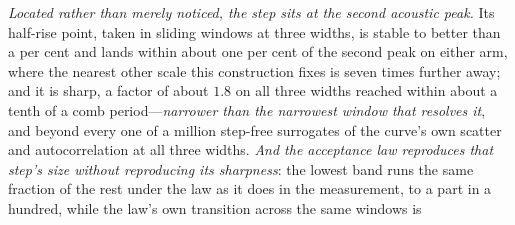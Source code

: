 \documentclass[11pt,a4paper]{article}
\theoremstyle{plain}
\theoremstyle{definition}
\theoremstyle{remark}
\begin{document}
\emph{Located rather than merely noticed, the step sits at the second acoustic peak.} Its half-rise point,
taken in sliding windows at three widths, is stable to better than a per cent and lands within about one per
cent of the second peak on either arm, where the nearest other scale this construction fixes is seven times
further away; and it is sharp, a factor of about $1.8$ on all three widths reached within about a tenth of a
comb period---\emph{narrower than the narrowest window that resolves it}, and beyond every one of a million step-free surrogates of the curve's own scatter and autocorrelation at all three widths. \emph{And the acceptance law reproduces that
step's size without reproducing its sharpness}: the lowest band runs the same fraction of the rest under the law
as it does in the measurement, to a part in a hundred, while the law's own transition across the same windows is
\end{document}
